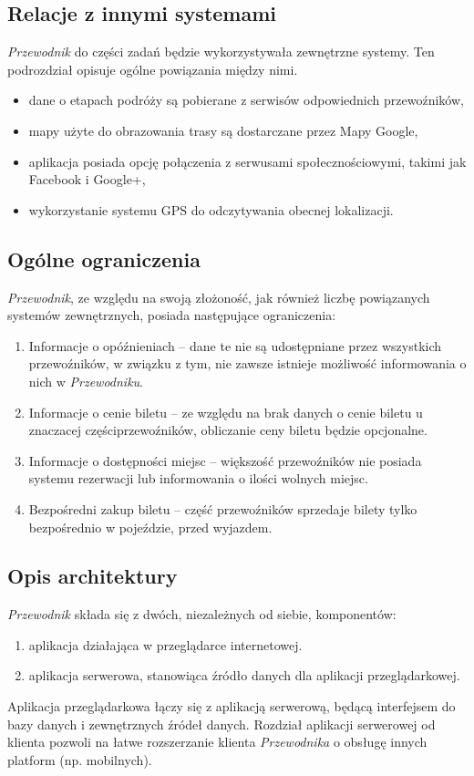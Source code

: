 \documentclass[12pt,a4paper]{report}
\begin{document}
\subsection{Relacje z innymi systemami}
	\emph{Przewodnik} do części zadań będzie wykorzystywała zewnętrzne systemy. Ten podrozdział opisuje ogólne powiązania między nimi.
\begin{itemize}
	\item dane o etapach podróży są pobierane z serwisów odpowiednich przewoźników,
	\item mapy użyte do obrazowania trasy są dostarczane przez Mapy Google,
	\item aplikacja posiada opcję połączenia z serwusami społecznościowymi, takimi jak Facebook i Google+,
	\item wykorzystanie systemu GPS do odczytywania obecnej lokalizacji.
\end{itemize}
\newpage
\subsection{Ogólne ograniczenia}
	\emph{Przewodnik}, ze względu na swoją złożoność, jak również liczbę powiązanych systemów zewnętrznych, posiada następujące ograniczenia:	
\begin{enumerate}
	\item Informacje o opóźnieniach -- dane te nie są udostępniane przez wszystkich przewoźników, w związku z tym, nie zawsze istnieje możliwość informowania o nich w \emph{Przewodniku}.
	\item Informacje o cenie biletu -- ze względu na brak danych o cenie biletu u znaczacej częściprzewoźników, obliczanie ceny biletu będzie opcjonalne.
	\item Informacje o dostępności miejsc -- większość przewoźników nie posiada systemu rezerwacji lub informowania o ilości wolnych miejsc.
	\item Bezpośredni zakup biletu -- część przewoźników sprzedaje bilety tylko bezpośrednio w pojeździe, przed wyjazdem.
\end{enumerate}
\subsection{Opis architektury}
\emph{Przewodnik} składa się z dwóch, niezależnych od siebie, komponentów:
\begin{enumerate}
	\item aplikacja działająca w przeglądarce internetowej.
	\item aplikacja serwerowa, stanowiąca źródło danych dla aplikacji przeglądarkowej.
\end{enumerate} 
	Aplikacja przeglądarkowa łączy się z aplikacją serwerową, będącą interfejsem do bazy danych i zewnętrznych źródeł danych. Rozdział aplikacji serwerowej od klienta pozwoli na łatwe rozszerzanie klienta \emph{Przewodnika} o obsługę innych platform (np. mobilnych).
\end{document}
